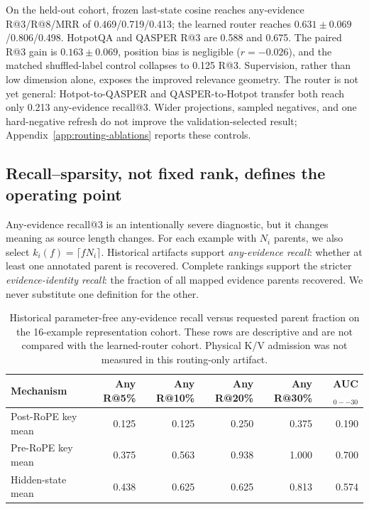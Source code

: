 \documentclass[11pt]{article}
\begin{document}
On the held-out cohort, frozen last-state cosine reaches any-evidence R@3/R@8/MRR of
0.469/0.719/0.413; the learned router reaches $0.631\pm0.069$/0.806/0.498. HotpotQA and QASPER
R@3 are 0.588 and 0.675. The paired R@3 gain is $0.163\pm0.069$, position bias is negligible
($r=-0.026$), and the matched shuffled-label control collapses to 0.125 R@3. Supervision, rather
than low dimension alone, exposes the improved relevance geometry. The router is not yet general:
Hotpot-to-QASPER and QASPER-to-Hotpot transfer both reach only 0.213 any-evidence recall@3.
Wider projections, sampled negatives, and one hard-negative refresh do not improve the
validation-selected result; Appendix~\ref{app:routing-ablations} reports these controls.

\subsection{Recall--sparsity, not fixed rank, defines the operating point}

Any-evidence recall@3 is an intentionally severe diagnostic, but it changes meaning as source
length changes. For each
example with $N_i$ parents, we also select $k_i(f)=\lceil fN_i\rceil$. Historical artifacts
support \emph{any-evidence recall}: whether at least one annotated parent is recovered. Complete
rankings support the stricter \emph{evidence-identity recall}: the fraction of all mapped evidence
parents recovered. We never substitute one definition for the other.

\begin{table}[H]
\centering
\small
\caption{Historical parameter-free any-evidence recall versus requested parent fraction on the
16-example representation cohort. These rows are descriptive and are not compared with the
learned-router cohort. Physical K/V admission was not measured in this routing-only artifact.}
\label{tab:recall-sparsity-main}
\begin{tabular}{lrrrrr}
\toprule
Mechanism & Any R@5\% & Any R@10\% & Any R@20\% & Any R@30\% & AUC$_{0--30}$ \\
\midrule
Post-RoPE key mean & 0.125 & 0.125 & 0.250 & 0.375 & 0.190 \\
Pre-RoPE key mean & 0.375 & 0.563 & 0.938 & 1.000 & 0.700 \\
Hidden-state mean & 0.438 & 0.625 & 0.625 & 0.813 & 0.574 \\
\bottomrule
\end{tabular}
\end{table}
\end{document}
